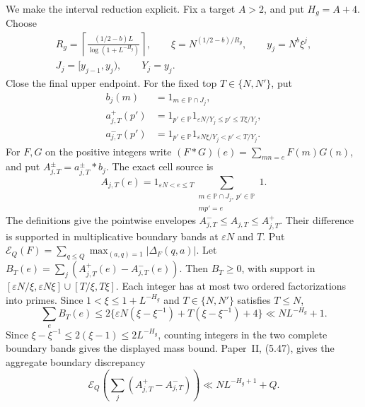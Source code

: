 We make the interval reduction explicit.
Fix a target \(A>2\), and put \(H_g=A+4\).
Choose
\begin{equation}\label{eq:k2-interval-grid}
\begin{gathered}
 R_g=\left\lceil
 \frac{(1/2-b)L}{\log(1+L^{-H_g})}\right\rceil,\qquad
 \xi=N^{(1/2-b)/R_g},\qquad y_j=N^b\xi^j,\\
 J_j=[y_{j-1},y_j),\qquad Y_j=y_j.
\end{gathered}
\end{equation}
Close the final upper endpoint.
For the fixed top \(T\in\{N,N'\}\), put
\begin{equation}\label{eq:k2-convolution-envelopes}
\begin{aligned}
 b_j(m)&=1_{m\in\mathbb P\cap J_j},\\
 a_{j,T}^+(p')&=1_{p'\in\mathbb P}
       1_{\varepsilon N/Y_j\le p'\le T\xi/Y_j},\\
 a_{j,T}^-(p')&=1_{p'\in\mathbb P}
       1_{\varepsilon N\xi/Y_j<p'<T/Y_j}.
\end{aligned}
\end{equation}
For \(F,G\) on the positive integers write
\((F*G)(e)=\sum_{mn=e}F(m)G(n)\), and put
\(A_{j,T}^{\pm}=a_{j,T}^{\pm}*b_j\). The exact cell source is
\begin{equation}\label{eq:k2-cell-source}
 A_{j,T}(e)=1_{\varepsilon N<e\le T}
       \sum_{\substack{m\in\mathbb P\cap J_j,\ p'\in\mathbb P\\mp'=e}}1.
\end{equation}
The definitions give the pointwise envelopes
\(A_{j,T}^-\le A_{j,T}\le A_{j,T}^+\).
Their difference is supported in multiplicative boundary bands at
\(\varepsilon N\) and \(T\). Put
\(\mathcal E_Q(F)=\sum_{q\le Q}\max_{(a,q)=1}|\Delta_F(q,a)|\).
Let
\(B_T(e)=\sum_j(A_{j,T}^+(e)-A_{j,T}^-(e))\). Then \(B_T\ge0\), with
support in
\([\varepsilon N/\xi,\varepsilon N\xi]\cup[T/\xi,T\xi]\). Each integer
has at most two ordered factorizations into primes. Since
\(1<\xi\le1+L^{-H_g}\) and \(T\in\{N,N'\}\) satisfies \(T\le N\),
\[
 \sum_e B_T(e)\le
 2\{\varepsilon N(\xi-\xi^{-1})+T(\xi-\xi^{-1})+4\}
 \ll NL^{-H_g}+1.
\]
Since \(\xi-\xi^{-1}\le2(\xi-1)\le2L^{-H_g}\), counting integers in the
two complete boundary bands gives the displayed mass bound.
Paper~II, (5.47), gives the aggregate boundary discrepancy
\begin{equation}\label{eq:k2-boundary-cost}
 \mathcal E_Q\!\left(\sum_j(A_{j,T}^+-A_{j,T}^-)\right)
       \ll NL^{-H_g+1}+Q.
\end{equation}
